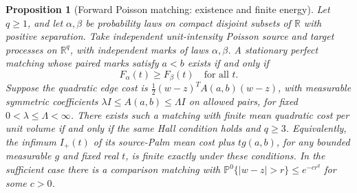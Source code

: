 \documentclass[11pt,reqno]{amsart}
\newtheorem{proposition}[theorem]{Proposition}
\theoremstyle{definition}
\theoremstyle{remark}
\numberwithin{equation}{section}
\newcommand{\R}{\mathbb R}
\begin{document}
\begin{proposition}[Forward Poisson matching: existence and finite energy]
\label{prop:forward-poisson-criterion}
Let \(q\ge1\), and let \(\alpha,\beta\) be probability laws on compact
disjoint subsets of \(\R\) with positive separation. Take independent
unit-intensity Poisson source and target processes on \(\R^q\), with
independent marks of laws \(\alpha,\beta\). A stationary perfect matching
whose paired marks satisfy \(a<b\) exists if and only if
\[
 F_\alpha(t)\ge F_\beta(t)\quad\text{for all }t.
\]
Suppose the quadratic edge cost is
\(\frac12(w-z)^T A(a,b)(w-z)\), with measurable symmetric coefficients
\(\lambda I\le A(a,b)\le\Lambda I\) on allowed pairs, for fixed
\(0<\lambda\le\Lambda<\infty\). There exists such a matching with finite mean
quadratic cost per unit volume if and only if the same Hall condition
holds and \(q\ge3\).
Equivalently, the infimum \(I_+(t)\) of its source-Palm mean cost plus
\(t g(a,b)\), for any bounded measurable \(g\) and fixed real \(t\),
is finite exactly under these conditions. In the sufficient case there
is a comparison matching with
\(\mathbb P^0\{|w-z|>r\}\le e^{-c r^q}\) for some \(c>0\).
\end{proposition}
\end{document}
